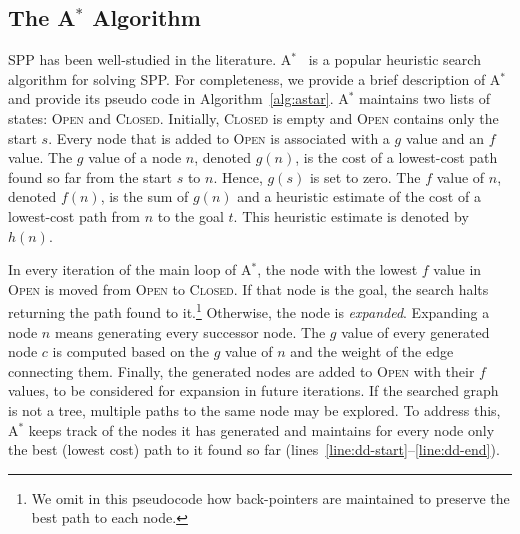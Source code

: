 \documentclass[twoside,11pt]{article}
\newcommand{\astar}{A$^*$\xspace}
\newcommand{\open}{\textsc{Open}\xspace}
\newcommand{\closed}{\textsc{Closed}\xspace}
\newcommand{\roni}[1]{\textbf{[RS:#1]}}
\begin{document}
\subsection{The \astar Algorithm}

SPP has been well-studied in the literature.
\astar~\cite{hartNR68Astar} is a popular heuristic search algorithm for solving SPP.
For completeness, we provide a brief description of \astar and provide its pseudo code in Algorithm~\ref{alg:astar}.
\astar maintains two lists of states: \open and \closed.
Initially, \closed is empty and \open contains only the start $s$.
Every node that is added to \open is associated with a $g$ value 
and an $f$ value.
The $g$ value of a node $n$, denoted $g(n)$, is the cost of a lowest-cost path found so far from the start $s$ to $n$.
Hence, $g(s)$ is set to zero.
The $f$ value of $n$, denoted $f(n)$, is the sum of $g(n)$ and a heuristic estimate of the cost of a lowest-cost path from $n$ to the goal $t$.
This heuristic estimate is denoted by $h(n)$. %


In every iteration of the main loop of \astar, the node with the lowest $f$ value in \open is moved from \open to \closed.
If that node is the goal, the search halts returning the path found to it.\footnote{We omit in this pseudocode how back-pointers are maintained to  preserve the best path to each node.}
Otherwise, the node is \emph{expanded}.
Expanding a node $n$ means generating every successor node. 
The $g$ value of every generated node $c$ is computed based on the $g$ value of $n$ and the weight of the edge connecting them. Finally, the generated nodes are added to \open with their $f$ values, to be considered for expansion in future iterations.
If the searched graph is not a tree, multiple paths to the same node may be explored.
To address this, \astar keeps track of the nodes it has generated and maintains for every node only the best (lowest cost) path to it found so far (lines~\ref{line:dd-start}--\ref{line:dd-end}).


\end{document}
